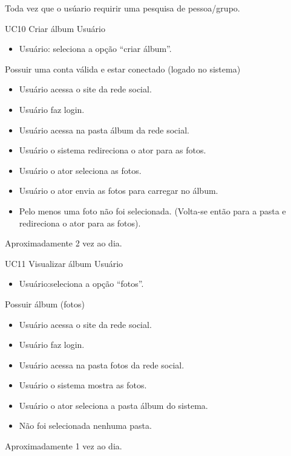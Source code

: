 {Toda vez que o usúario requirir uma pesquisa de pessoa/grupo.}
{

}
\casoDeUso
{UC10}
{Criar álbum}
{Usuário}
{
\begin{itemize}
	\item Usuário: seleciona a opção “criar álbum”.
	
\end{itemize}

}
{Possuir uma conta válida e estar conectado (logado no sistema)}
{}
{
\begin{itemize}
	\item Usuário acessa o site da rede social.
	\item Usuário faz login.
	\item Usuário acessa na pasta álbum da rede social.
	\item Usuário o sistema redireciona o ator para as fotos.
	\item Usuário o ator seleciona as fotos.
	\item Usuário o ator envia as fotos para carregar no álbum.
\end{itemize}
}
{
\begin{itemize}
	\item Pelo menos uma foto não foi selecionada.
	(Volta-se então para a pasta e redireciona o ator para as fotos).
\end{itemize}
}
{Aproximadamente 2 vez ao dia.}
{

}


\casoDeUso
{UC11}
{Visualizar álbum}
{Usuário}
{
\begin{itemize}
	\item Usuário:seleciona a opção “fotos”.
	
\end{itemize}

}
 {Possuir álbum (fotos)}
{}
{
\begin{itemize}
	\item Usuário acessa o site da rede social.
	\item Usuário faz login.
	\item Usuário acessa na pasta fotos da rede social.
	\item Usuário o sistema mostra as fotos.
	\item Usuário o ator seleciona a pasta álbum do sistema.
\end{itemize}
}
{
\begin{itemize}
	\item Não foi selecionada nenhuma pasta.

\end{itemize}
}
{Aproximadamente 1 vez ao dia.}
{

}

